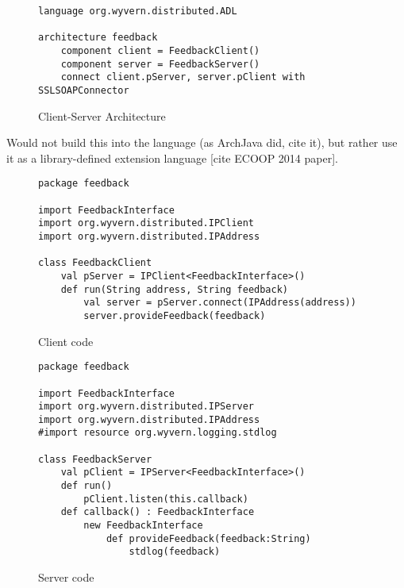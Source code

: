 \documentclass[runningheads]{llncs}
\begin{document}
\begin{sloppypar}
\begin{figure}[t]
\begin{lstlisting}
language org.wyvern.distributed.ADL

architecture feedback
    component client = FeedbackClient()
    component server = FeedbackServer()
    connect client.pServer, server.pClient with SSLSOAPConnector
\end{lstlisting}
\caption{Client-Server Architecture}
\label{f-architecture}
\end{figure}

Would not build this into the language (as ArchJava did, cite it), but rather use it as a library-defined extension language [cite ECOOP 2014 paper].

\begin{figure}[t]
\begin{lstlisting}
package feedback

import FeedbackInterface
import org.wyvern.distributed.IPClient
import org.wyvern.distributed.IPAddress

class FeedbackClient
    val pServer = IPClient<FeedbackInterface>()
    def run(String address, String feedback)
        val server = pServer.connect(IPAddress(address))
        server.provideFeedback(feedback)
\end{lstlisting}
\caption{Client code}
\label{f-client}
\end{figure}

\begin{figure}[t]
\begin{lstlisting}
package feedback

import FeedbackInterface
import org.wyvern.distributed.IPServer
import org.wyvern.distributed.IPAddress
#import resource org.wyvern.logging.stdlog

class FeedbackServer
    val pClient = IPServer<FeedbackInterface>()
    def run()
        pClient.listen(this.callback)
    def callback() : FeedbackInterface
        new FeedbackInterface
            def provideFeedback(feedback:String)
                stdlog(feedback)

\end{lstlisting}
\caption{Server code}
\label{f-server}
\end{figure}






\end{sloppypar}
\end{document}
